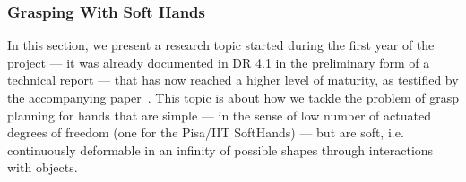 
\subsubsection{Grasping With Soft Hands}

In this section, we present a research topic started during the first year of the project --- it was already documented in DR 4.1 in the preliminary form of a technical report --- that has now reached a higher level of maturity, as testified by the accompanying paper~\cite{Bonilla:Humanoids:2015}. This topic is about how we tackle the problem of grasp planning for hands that are simple --- in the sense of low number of actuated degrees of freedom (one for the Pisa/IIT SoftHands) --- but are soft, i.e. continuously deformable in an infinity of possible shapes through interactions with objects. 